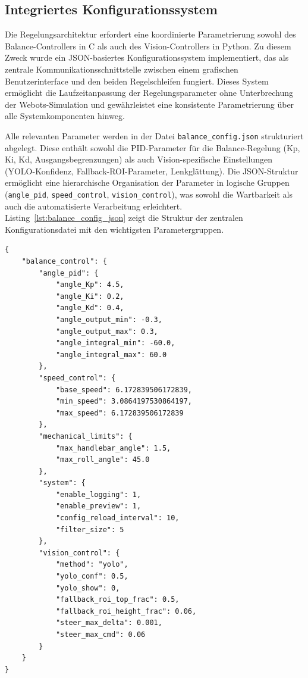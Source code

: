  

  \subsection{Integriertes Konfigurationssystem}

  Die Regelungsarchitektur erfordert eine koordinierte Parametrierung sowohl des Balance-Controllers in C als auch des Vision-Controllers in Python. 
  Zu diesem Zweck wurde ein JSON-basiertes Konfigurationssystem implementiert, das als zentrale Kommunikationsschnittstelle zwischen einem 
  grafischen Benutzerinterface und den beiden Regelschleifen fungiert. Dieses System ermöglicht die Laufzeitanpassung der Regelungsparameter 
  ohne Unterbrechung der Webots-Simulation und gewährleistet eine konsistente Parametrierung über alle Systemkomponenten hinweg.

  Alle relevanten Parameter werden in der Datei \texttt{balance\_config.json} strukturiert abgelegt. Diese enthält 
  sowohl die PID-Parameter für die Balance-Regelung (Kp, Ki, Kd, Ausgangsbegrenzungen) als auch Vision-spezifische Einstellungen (YOLO-Konfidenz, 
  Fallback-ROI-Parameter, Lenkglättung). Die JSON-Struktur ermöglicht eine hierarchische Organisation der Parameter in logische Gruppen 
  (\texttt{angle\_pid}, \texttt{speed\_control}, \texttt{vision\_control}), was sowohl die Wartbarkeit als auch die automatisierte Verarbeitung erleichtert. 
  Listing~\ref{lst:balance_config_json} zeigt die Struktur der zentralen Konfigurationsdatei mit den wichtigsten Parametergruppen.

  \begin{lstlisting}[style=json,caption={Struktur der zentralen Konfigurationsdatei \texttt{balance\_config.json}},label={lst:balance_config_json}]
{
    "balance_control": {
        "angle_pid": {
            "angle_Kp": 4.5,
            "angle_Ki": 0.2,
            "angle_Kd": 0.4,
            "angle_output_min": -0.3,
            "angle_output_max": 0.3,
            "angle_integral_min": -60.0,
            "angle_integral_max": 60.0
        },
        "speed_control": {
            "base_speed": 6.172839506172839,
            "min_speed": 3.0864197530864197,
            "max_speed": 6.172839506172839
        },
        "mechanical_limits": {
            "max_handlebar_angle": 1.5,
            "max_roll_angle": 45.0
        },
        "system": {
            "enable_logging": 1,
            "enable_preview": 1,
            "config_reload_interval": 10,
            "filter_size": 5
        },
        "vision_control": {
            "method": "yolo",
            "yolo_conf": 0.5,
            "yolo_show": 0,
            "fallback_roi_top_frac": 0.5,
            "fallback_roi_height_frac": 0.06,
            "steer_max_delta": 0.001,
            "steer_max_cmd": 0.06
        }
    }
}
  \end{lstlisting}

